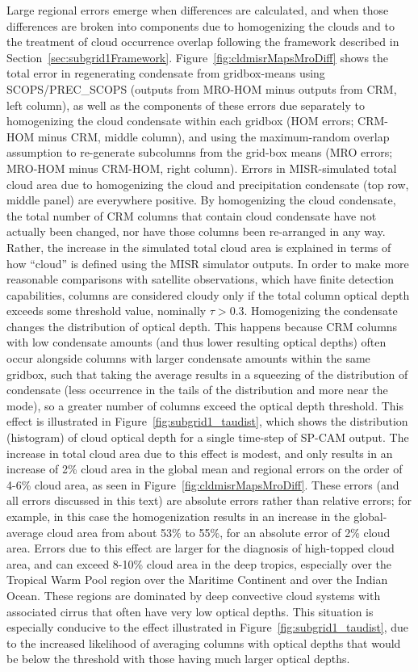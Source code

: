 Large regional errors emerge when differences are calculated, and when
those differences are broken into components due to homogenizing the
clouds and to the treatment of cloud occurrence overlap following the
framework described in Section~\ref{sec:subgrid1Framework}.
Figure~\ref{fig:cldmisrMapsMroDiff} shows the total error in
regenerating condensate from gridbox-means using SCOPS/PREC\_SCOPS
(outputs from MRO-HOM minus outputs from CRM, left column), as well as
the components of these errors due separately to homogenizing the cloud
condensate within each gridbox (HOM errors; CRM-HOM minus CRM, middle
column), and using the maximum-random overlap assumption to re-generate
subcolumns from the grid-box means (MRO errors; MRO-HOM minus CRM-HOM,
right column). Errors in MISR-simulated total cloud area due to
homogenizing the cloud and precipitation condensate (top row, middle
panel) are everywhere positive. By homogenizing the cloud condensate,
the total number of CRM columns that contain cloud condensate have not
actually been changed, nor have those columns been re-arranged in any
way. Rather, the increase in the simulated total cloud area is explained
in terms of how ``cloud'' is defined using the MISR simulator outputs.
In order to make more reasonable comparisons with satellite
observations, which have finite detection capabilities, columns are
considered cloudy only if the total column optical depth exceeds some
threshold value, nominally \(\tau > 0.3\). Homogenizing the condensate
changes the distribution of optical depth. This happens because CRM
columns with low condensate amounts (and thus lower resulting optical
depths) often occur alongside columns with larger condensate amounts
within the same gridbox, such that taking the average results in a
squeezing of the distribution of condensate (less occurrence in the
tails of the distribution and more near the mode), so a greater number
of columns exceed the optical depth threshold. This effect is
illustrated in Figure~\ref{fig:subgrid1_taudist}, which shows the
distribution (histogram) of cloud optical depth for a single time-step
of SP-CAM output. The increase in total cloud area due to this effect is
modest, and only results in an increase of 2\% cloud area in the global
mean and regional errors on the order of 4-6\% cloud area, as seen in
Figure~\ref{fig:cldmisrMapsMroDiff}. These errors (and all errors
discussed in this text) are absolute errors rather than relative errors;
for example, in this case the homogenization results in an increase in
the global-average cloud area from about 53\% to 55\%, for an absolute
error of 2\% cloud area. Errors due to this effect are larger for the
diagnosis of high-topped cloud area, and can exceed 8-10\% cloud area in
the deep tropics, especially over the Tropical Warm Pool region over the
Maritime Continent and over the Indian Ocean. These regions are
dominated by deep convective cloud systems with associated cirrus that
often have very low optical depths. This situation is especially
conducive to the effect illustrated in
Figure~\ref{fig:subgrid1_taudist}, due to the increased likelihood of
averaging columns with optical depths that would be below the threshold
with those having much larger optical depths.

